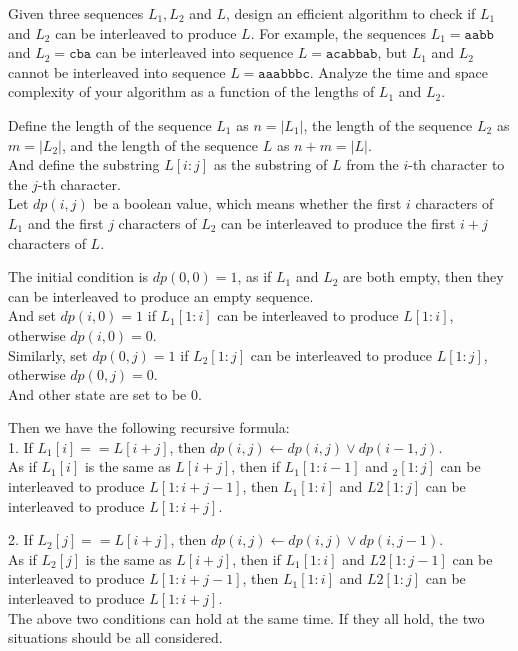 \problem{}
Given three sequences $L_1, L_2$ and $L$, design an efficient algorithm to check if $L_1$ and $L_2$ can be interleaved to produce $L$.  For example, the sequences $L_1 = \texttt{aabb}$ and $L_2 = \texttt{cba}$ can be interleaved into sequence $L = \texttt{acabbab}$, but $L_1$ and $L_2$ cannot be interleaved into sequence $L = \texttt{aaabbbc}$.  Analyze the time and space complexity of your algorithm as a function of the lengths of $L_1$ and $L_2$.

\solution{}
Define the length of the sequence $L_1$ as $n=|L_1|$, the length of the sequence $L_2$ as $m=|L_2|$, and the length of the sequence $L$ as $n+m=|L|$.\\
And define the substring $L[i:j]$ as the substring of $L$ from the $i$-th character to the $j$-th character.\\
Let $dp(i,j)$ be a boolean value, which means whether the first $i$ characters of $L_1$ and the first $j$ characters of $L_2$ can be interleaved to produce the first $i+j$ characters of $L$.

The initial condition is $dp(0,0)=1$, as if $L_1$ and $L_2$ are both empty, then they can be interleaved to produce an empty sequence. \\
And set $dp(i,0)=1$ if $L_1[1:i]$ can be interleaved to produce $L[1:i]$, otherwise $dp(i,0)=0$.\\
Similarly, set $dp(0,j)=1$ if $L_2[1:j]$ can be interleaved to produce $L[1:j]$, otherwise $dp(0,j)=0$.\\
And other state are set to be $0$.

Then we have the following recursive formula:\\
1. If $L_1[i] == L[i+j]$, then $dp(i,j) \gets dp(i,j) \lor dp(i-1,j)$.\\
As if $L_1[i]$ is the same as $L[i+j]$, then if $L_1[1:i-1]$ and $_2[1:j]$ can be interleaved to produce $L[1:i+j-1]$, then $L_1[1:i]$ and $L2[1:j]$ can be interleaved to produce $L[1:i+j]$.

2. If $L_2[j] == L[i+j]$, then $dp(i,j) \gets dp(i,j) \lor dp(i,j-1)$.\\
As if $L_2[j]$ is the same as $L[i+j]$, then if $L_1[1:i]$ and $L2[1:j-1]$ can be interleaved to produce $L[1:i+j-1]$, then $L_1[1:i]$ and $L2[1:j]$ can be interleaved to produce $L[1:i+j]$.\\
The above two conditions can hold at the same time. If they all hold, the two situations should be all considered.\\

